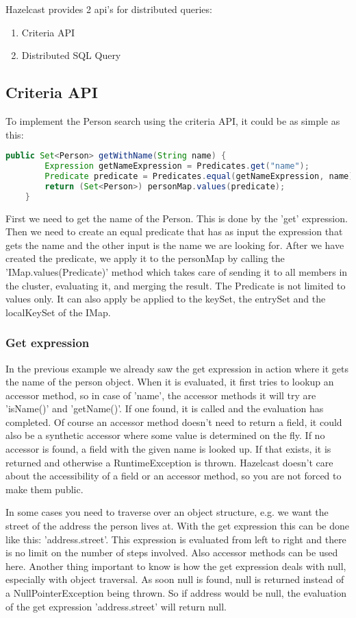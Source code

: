 Hazelcast provides 2 api's for distributed queries:
\begin{enumerate}
\item Criteria API
\item Distributed SQL Query
\end{enumerate}

\subsection*{Criteria API}
To implement the Person search using the criteria API, it could be as simple as this:
\begin{lstlisting}[language=java]
    public Set<Person> getWithName(String name) {
        Expression getNameExpression = Predicates.get("name");
        Predicate predicate = Predicates.equal(getNameExpression, name);
        return (Set<Person>) personMap.values(predicate);
    }
\end{lstlisting}
First we need to get the name of the Person. This is done by the 'get' expression. Then we need to create an equal predicate that has as input the expression that gets the name and the other input is the name we are looking for. After we have created the predicate, we apply it to the personMap by calling the 'IMap.values(Predicate)' method which takes care of sending it to all members in the cluster, evaluating it, and merging the result. The Predicate is not limited to values only. It can also apply be applied to the keySet, the entrySet and the localKeySet of the IMap. 

\subsubsection*{Get expression}
In the previous example we already saw the get expression in action where it gets the name of the person object. When it is evaluated, it first tries to lookup an accessor method, so in case of 'name', the accessor methods it will try are 'isName()' and 'getName()'. If one found, it is called and the evaluation has completed. Of course an accessor method doesn't need to return a field, it could also be a synthetic accessor where some value is determined on the fly. If no accessor is found, a field with the given name is looked up. If that exists, it is returned and otherwise a RuntimeException is thrown. Hazelcast doesn't care about the accessibility of a field or an accessor method, so you are not forced to make them public.

In some cases you need to traverse over an object structure, e.g. we want the street of the address the person lives at. With the get expression this can be done like this: 'address.street'. This expression is evaluated from left to right and there is no limit on the number of steps involved. Also accessor methods can be used here. Another thing important to know is how the get expression deals with null, especially with object traversal. As soon null is found, null is returned instead of a NullPointerException being thrown. So if address would be null, the evaluation of the get expression 'address.street' will return null.

